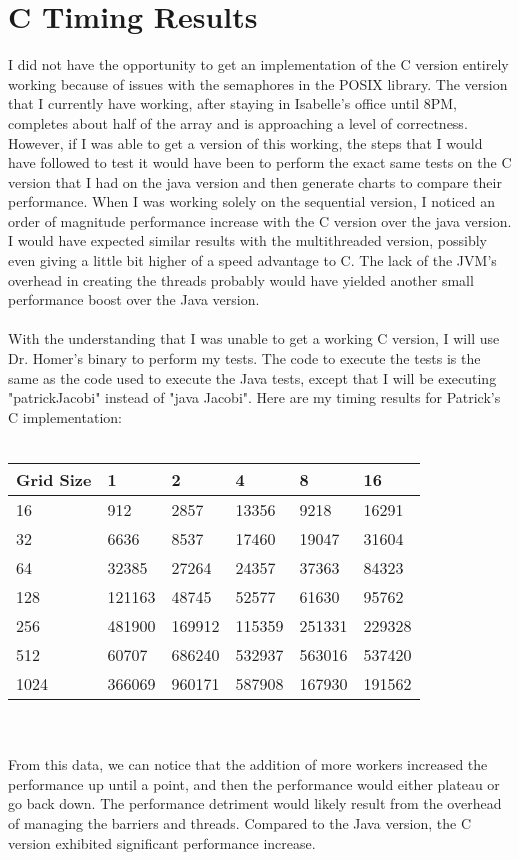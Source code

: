 \documentclass{article}%
\begin{document}
\section{C Timing Results}
I did not have the opportunity to get an implementation of the C version entirely working because of issues with the semaphores in the POSIX library. The version that I currently have working, after staying in Isabelle's office until 8PM, completes about half of the array and is approaching a level of correctness. However, if I was able to get a version of this working, the steps that I would have followed to test it would have been to perform the exact same tests on the C version that I had on the java version and then generate charts to compare their performance. When I was working solely on the sequential version, I noticed an order of magnitude performance increase with the C version over the java version. I would have expected similar results with the multithreaded version, possibly even giving a little bit higher of a speed advantage to C. The lack of the JVM's overhead in creating the threads probably would have yielded another small performance boost over the Java version.\\
\\
With the understanding that I was unable to get a working C version, I will use Dr. Homer's binary to perform my tests. The code to execute the tests is the same as the code used to execute the Java tests, except that I will be executing "patrickJacobi" instead of "java Jacobi". Here are my timing results for Patrick's C implementation:\\
\\
\begin{tabular}{| l | l | l | l | l | l |}
    \hline
    Grid Size & 1 & 2 & 4 & 8 & 16\\ \hline
    16 & 912 & 2857 & 13356 & 9218 & 16291 \\ \hline
    32 & 6636 & 8537 & 17460 & 19047 & 31604\\ \hline
    64 & 32385 & 27264 & 24357 & 37363 & 84323 \\ \hline
    128 & 121163 & 48745 & 52577 & 61630 & 95762 \\ \hline
    256 & 481900 & 169912 & 115359 & 251331 & 229328 \\ \hline
    512 & 60707 & 686240 & 532937 & 563016 & 537420 \\ \hline
    1024 & 366069 & 960171 & 587908 & 167930 & 191562 \\ \hline
\end{tabular}\\
\\
From this data, we can notice that the addition of more workers increased the performance up until a point, and then the performance would either plateau or go back down. The performance detriment would likely result from the overhead of managing the barriers and threads. Compared to the Java version, the C version exhibited significant performance increase.
\end{document}

